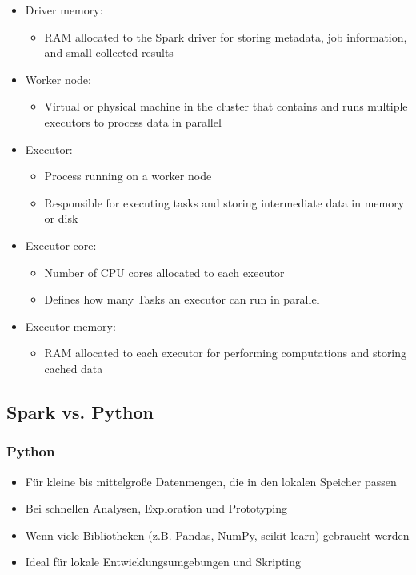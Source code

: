 \documentclass[11pt]{scrartcl}
\begin{document}
\begin{itemize}
\begin{itemize}
	\end{itemize}
	\item Driver memory:
	\begin{itemize}
		\item RAM allocated to the Spark driver for storing metadata, job information, and small collected results
	\end{itemize}
	\item Worker node:
	\begin{itemize}
		\item Virtual or physical machine in the cluster that contains and runs multiple executors to process data in parallel
	\end{itemize}
	\item Executor:
	\begin{itemize}
		\item Process running on a worker node
		\item Responsible for executing tasks and storing intermediate data in memory or disk
	\end{itemize}
	\item Executor core:
	\begin{itemize}
		\item Number of CPU cores allocated to each executor
		\item Defines how many Tasks an executor can run in parallel
	\end{itemize}
	\item Executor memory:
	\begin{itemize}
		\item RAM allocated to each executor for performing computations and storing cached data
	\end{itemize}
\end{itemize}

\subsection{Spark vs. Python}
\subsubsection{Python}
\begin{itemize}
	\item Für kleine bis mittelgroße Datenmengen, die in den lokalen Speicher passen
	\item Bei schnellen Analysen, Exploration und Prototyping
	\item Wenn viele Bibliotheken (z.B. Pandas, NumPy, scikit-learn) gebraucht werden
	\item Ideal für lokale Entwicklungsumgebungen und Skripting 
\end{itemize}
\end{document}
